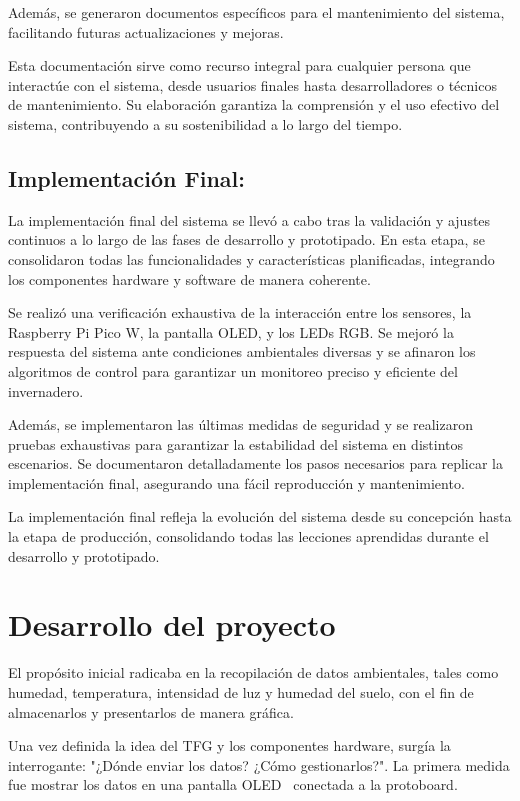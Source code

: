 Además, se generaron documentos específicos para el mantenimiento del sistema, facilitando futuras actualizaciones y mejoras.

Esta documentación sirve como recurso integral para cualquier persona que interactúe con el sistema, desde usuarios finales hasta desarrolladores o técnicos de mantenimiento. Su elaboración garantiza la comprensión y el uso efectivo del sistema, contribuyendo a su sostenibilidad a lo largo del tiempo.

\subsection{Implementación Final:}
La implementación final del sistema se llevó a cabo tras la validación y ajustes continuos a lo largo de las fases de desarrollo y prototipado. En esta etapa, se consolidaron todas las funcionalidades y características planificadas, integrando los componentes hardware y software de manera coherente.

Se realizó una verificación exhaustiva de la interacción entre los sensores, la Raspberry Pi Pico W, la pantalla OLED, y los LEDs RGB. Se mejoró la respuesta del sistema ante condiciones ambientales diversas y se afinaron los algoritmos de control para garantizar un monitoreo preciso y eficiente del invernadero.

Además, se implementaron las últimas medidas de seguridad y se realizaron pruebas exhaustivas para garantizar la estabilidad del sistema en distintos escenarios. Se documentaron detalladamente los pasos necesarios para replicar la implementación final, asegurando una fácil reproducción y mantenimiento.

La implementación final refleja la evolución del sistema desde su concepción hasta la etapa de producción, consolidando todas las lecciones aprendidas durante el desarrollo y prototipado.

\section{Desarrollo del proyecto}

El propósito inicial radicaba en la recopilación de datos ambientales, tales como humedad, temperatura, intensidad de luz y humedad del suelo, con el fin de almacenarlos y presentarlos de manera gráfica.

Una vez definida la idea del TFG y los componentes hardware, surgía la interrogante: "¿Dónde enviar los datos? ¿Cómo gestionarlos?". La primera medida fue mostrar los datos en una pantalla OLED~\cite{manual:Oled} conectada a la protoboard.

